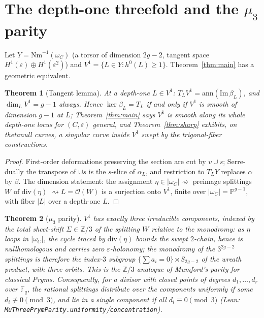 \documentclass[11pt]{article}
\newtheorem{theorem}{Theorem}[section]
\newcommand{\Nm}{\mathrm{Nm}}
\newcommand{\OO}{\mathcal{O}}
\begin{document}
\section{The depth-one threefold and the $\mu_3$ parity}\label{sec:threefold}

Let $Y=\Nm^{-1}(\omega_C)$ (a torsor of dimension $2g-2$, tangent space
$H^1(\varepsilon)\oplus H^1(\varepsilon^2)$) and
$V^1=\{L\in Y: h^0(L)\ge1\}$.  Theorem~\ref{thm:main} has a geometric
equivalent.

\begin{theorem}[Tangent lemma]\label{thm:T}
At a depth-one $L\in V^1$: $T_LV^1=\mathrm{ann}(\mathrm{Im}\,\beta_L)$, and
$\dim_LV^1=g-1$ always.  Hence $\ker\beta_L=T_L$ if and only if $V^1$ is
smooth of dimension $g-1$ at $L$; Theorem~\ref{thm:main} says $V^1$ is
smooth along its whole depth-one locus for $(C,\varepsilon)$ general, and
Theorem~\ref{thm:sharp} exhibits, on thetanull curves, a singular
\emph{curve} inside $V^1$ swept by the trigonal-fiber constructions.
\end{theorem}

\begin{proof}
First-order deformations preserving the section are cut by $v\cup s$;
Serre-dually the transpose of $\cup s$ is the $s$-slice of $\alpha_L$, and
restriction to $T_LY$ replaces $\alpha$ by $\beta$.  The dimension
statement: the assignment $\eta\in|\omega_C|\rightsquigarrow$ preimage
splittings $W$ of $\mathrm{div}(\eta)$ $\rightsquigarrow L=\OO(W)$ is a
surjection onto $V^1$, finite over $|\omega_C|=\mathbb P^{g-1}$, with fiber
$|L|$ over a depth-one $L$.
\end{proof}

\begin{theorem}[$\mu_3$ parity]\label{thm:parity}
$V^1$ has exactly three irreducible components, indexed by the total
sheet-shift $\Sigma\in\mathbb Z/3$ of the splitting $W$ relative to the
monodromy: as $\eta$ loops in $|\omega_C|$, the cycle traced by
$\mathrm{div}(\eta)$ bounds the swept $2$-chain, hence is nullhomologous
and carries zero $\varepsilon$-holonomy; the monodromy of the $3^{2g-2}$
splittings is therefore the index-$3$ subgroup
$\{\sum a_i=0\}\rtimes S_{2g-2}$ of the wreath product, with three orbits.
This is the $\mathbb Z/3$-analogue of Mumford's parity for classical
Pryms.  Consequently, for a divisor with closed points of degrees
$d_1,\dots,d_r$ over $\mathbb F_q$, the rational splittings distribute
over the components uniformly if some $d_i\not\equiv0 \pmod 3$, and lie
in a single component if all $d_i\equiv0\pmod3$
(Lean: \texttt{MuThreePrymParity.uniformity}/\texttt{concentration}).
\end{theorem}
\end{document}
